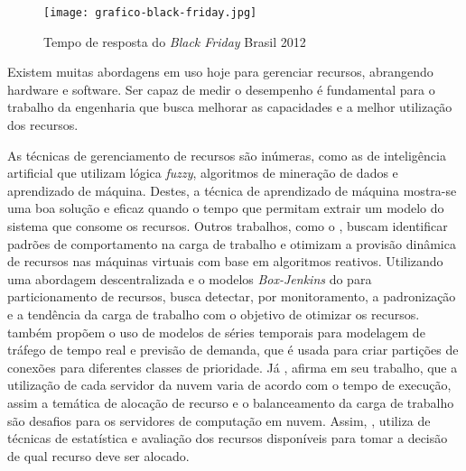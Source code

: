 \begin{figure}[htb]
	\caption{Tempo de resposta do \textit{Black Friday} Brasil 2012}
	\label{fig:grafico-black-friday}
	\centering
	\texttt{[image: grafico-black-friday.jpg]}
\end{figure}


Existem muitas abordagens em uso hoje para gerenciar recursos, abrangendo hardware e software. Ser capaz de medir o desempenho é fundamental para o trabalho da engenharia que busca melhorar as capacidades e a melhor utilização dos recursos.

As técnicas de gerenciamento de recursos são inúmeras, como as de inteligência artificial que utilizam lógica \textit{fuzzy}, algoritmos de mineração de dados e aprendizado de máquina. Destes, a técnica de aprendizado de máquina mostra-se uma boa solução e eficaz quando o tempo que permitam extrair um modelo do sistema que consome os recursos. Outros trabalhos, como o \cite{Zhang2007}, buscam identificar padrões de comportamento na carga de trabalho e otimizam a provisão dinâmica de recursos nas máquinas virtuais com base em algoritmos reativos. Utilizando uma abordagem descentralizada e o modelos \textit{Box-Jenkins} do \cite{box2011} para particionamento de recursos, \cite{Quiroz2009} busca detectar, por monitoramento, a padronização e a tendência da carga de trabalho com o objetivo de otimizar os recursos. \cite{Nobile2013} também propõem o uso de modelos de séries temporais para modelagem de tráfego de tempo real e previsão de demanda, que é usada para criar partições de conexões para diferentes classes de prioridade. Já \cite{Zhang2011}, afirma em seu trabalho, que a utilização de cada servidor da nuvem varia de acordo com o tempo de execução, assim a temática de alocação de recurso e o balanceamento da carga de trabalho são desafios para os servidores de computação em nuvem. Assim, \cite{Zhang2011}, utiliza de técnicas de estatística e avaliação dos recursos disponíveis para tomar a decisão de qual recurso deve ser alocado.

